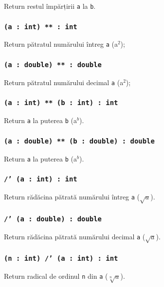 Return restul împărțirii \texttt{a} la \texttt{b}.


\subsubsection{\texttt{(a : int) ** : int}}

Return pătratul numărului întreg \texttt{a} (a$^2$);

\subsubsection{\texttt{(a : double) ** : double}}

Return pătratul numărului decimal \texttt{a} (a$^2$);

\subsubsection{\texttt{(a : int) ** (b : int) : int}}

Return \texttt{a} la puterea \texttt{b} (a$^b$).

\subsubsection{\texttt{(a : double) ** (b : double) : double}}

Return \texttt{a} la puterea \texttt{b} (a$^b$).

\subsubsection{\texttt{/' (a : int) : int}}

Return rădăcina pătrată numărului întreg \texttt{a} ($\sqrt{a}$).

\subsubsection{\texttt{/' (a : double) : double}}

Return rădăcina pătrată numărului decimal \texttt{a} ($\sqrt{a}$).

\subsubsection{\texttt{(n : int) /' (a : int) : int}}

Return radical de ordinul \texttt{n} din \texttt{a} ($\sqrt[n]{a}$).

